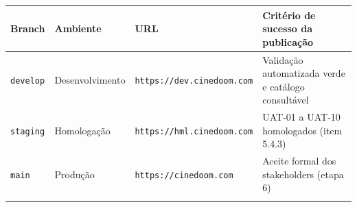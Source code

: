 {\footnotesize
\begin{tabularx}{\textwidth}{L{1.40cm} L{2.59cm} >{\hsize\sloppy\arraybackslash}X >{\hsize\sloppy\arraybackslash}X}
\toprule
{}
\textbf{Branch} & \textbf{Ambiente} & \textbf{URL} & \textbf{Critério de sucesso da publicação} \\
\midrule
{}
\texttt{develop} & Desenvolvimento & \texttt{https:/\allowbreak{}/\allowbreak{}dev.\allowbreak{}cinedoom.\allowbreak{}com} & Validação automatizada verde e catálogo consultável \\
\midrule
\texttt{staging} & Homologação & \texttt{https:/\allowbreak{}/\allowbreak{}hml.\allowbreak{}cinedoom.\allowbreak{}com} & UAT-01 a UAT-10 homologados (item 5.4.3) \\
\midrule
\texttt{main} & Produção & \texttt{https:/\allowbreak{}/\allowbreak{}cinedoom.\allowbreak{}com} & Aceite formal dos stakeholders (etapa 6) \\
\bottomrule
\end{tabularx}%
}
